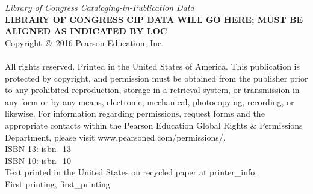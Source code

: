 {\noindent\textit{Library of Congress Cataloging-in-Publication Data}\\[.75ex]  %
\textbf{LIBRARY OF CONGRESS CIP DATA WILL GO HERE; MUST BE ALIGNED AS INDICATED BY LOC}\\[.75ex]
\noindent Copyright~\copyright~2016 Pearson Education, Inc.\\
\hspace{\fill}\\
\noindent All rights reserved. Printed in the United States of America. This publication is protected by copyright, and permission must be obtained from the publisher prior to any prohibited reproduction, storage in a retrieval system, or transmission in any form or by any means, electronic, mechanical, photocopying, recording, or likewise. For information regarding permissions, request forms and the appropriate contacts within the Pearson Education Global Rights \& Permissions Department, please visit www.pearsoned.com/permissions/.\\[.75ex]

\noindent ISBN-13: {{isbn_13}}\\[-.5ex] %
\noindent ISBN-10: {{isbn_10}} \\[-.5ex] %
\noindent Text printed in the United States on recycled paper at {{printer_info}}.\\[-.5ex] %
\noindent First printing, {{first_printing}} %
}
